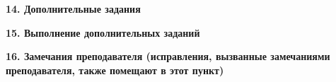 \documentclass[12pt,fleqn]{article}
\begin{document}
\begin{justify}
    \textbf{14. Дополнительные задания} \\
\end{justify}

\begin{justify}
    \textbf{15. Выполнение дополнительных заданий} \\
\end{justify}

\begin{justify}
    \textbf{16. Замечания преподавателя (исправления, вызванные замечаниями преподавателя, также помещают в этот пункт)} \\
\end{justify}
\end{document}
